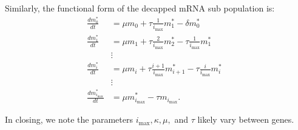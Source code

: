 \documentclass[10pt,letterpaper]{article}
\newcommand{\imax}{\ensuremath{{i_{\max}}}\xspace}
\begin{document}
Similarly, the functional form of the decapped mRNA sub population is: 
\begin{align}\label{eq:Decapped_ODE}
  \frac{dm_{0}^{*}}{dt} &= \mu m_{0}+ \tau \frac{1}{\imax}m_{1}^{*}-\delta m_{0}^{*} \nonumber \\
  \frac{dm_{1}^{*}}{dt} &= \mu m_{1}+ \tau \frac{2}{\imax}m_{2}^{*}-\tau \frac{1}{\imax} m_{1}^{*} \nonumber \\
                        & \vdots & \nonumber \\
  \frac{dm_{i}^{*}}{dt} &= \mu m_{i}+ \tau \frac{i+1}{\imax}m_{i+1}^{*}-\tau \frac{i}{\imax} m_{i}^{*} \nonumber \\
                        & \vdots & \nonumber \\
  \frac{dm_{\imax}^{*}}{dt} &= \mu m_{\imax}^{*}- \tau m_{\imax}. 
\end{align}

In closing, we note the parameters $\imax, \kappa, \mu,$ and $\tau$ likely vary between genes.
\end{document}
